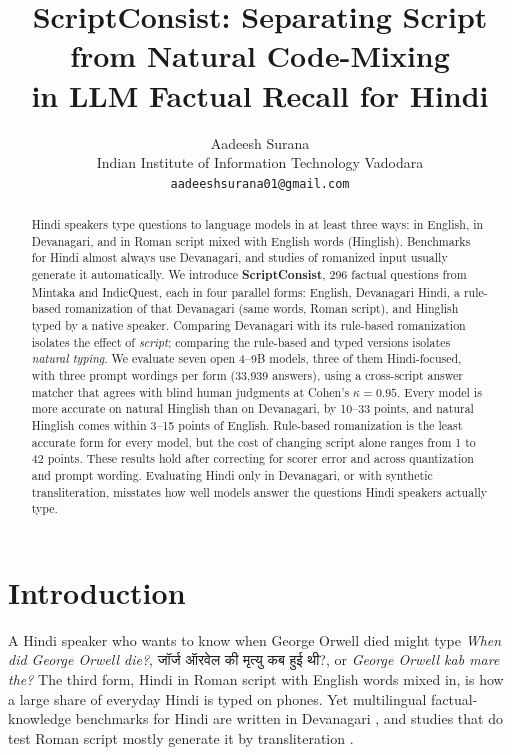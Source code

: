\documentclass[11pt]{article}
\title{ScriptConsist: Separating Script from Natural Code-Mixing\\in LLM Factual Recall for Hindi}
\author{Aadeesh Surana \\
  Indian Institute of Information Technology Vadodara \\
  \texttt{aadeeshsurana01@gmail.com}}
\newcommand{\hi}[1]{{\devfont #1}}
\newcommand{\Dev}{Devanagari}
\newcommand{\Hng}{natural Hinglish}
\begin{document}
\maketitle

\begin{abstract}
Hindi speakers type questions to language models in at least three ways: in English, in Devanagari, and in Roman script mixed with English words (Hinglish).
Benchmarks for Hindi almost always use Devanagari, and studies of romanized input usually generate it automatically.
We introduce \textbf{ScriptConsist}, 296 factual questions from Mintaka and IndicQuest, each in four parallel forms: English, \Dev{} Hindi, a rule-based romanization of that \Dev{} (same words, Roman script), and Hinglish typed by a native speaker.
Comparing \Dev{} with its rule-based romanization isolates the effect of \emph{script}; comparing the rule-based and typed versions isolates \emph{natural typing}.
We evaluate seven open 4--9B models, three of them Hindi-focused, with three prompt wordings per form (33{,}939 answers), using a cross-script answer matcher that agrees with blind human judgments at Cohen's $\kappa = 0.95$.
Every model is more accurate on \Hng{} than on \Dev{}, by 10--33 points, and \Hng{} comes within 3--15 points of English.
Rule-based romanization is the least accurate form for every model, but the cost of changing script alone ranges from 1 to 42 points.
These results hold after correcting for scorer error and across quantization and prompt wording.
Evaluating Hindi only in \Dev{}, or with synthetic transliteration, misstates how well models answer the questions Hindi speakers actually type.
\end{abstract}

\section{Introduction}

A Hindi speaker who wants to know when George Orwell died might type \emph{When did George Orwell die?}, \hi{जॉर्ज ऑरवेल की मृत्यु कब हुई थी}?, or \emph{George Orwell kab mare the?}
The third form, Hindi in Roman script with English words mixed in, is how a large share of everyday Hindi is typed on phones.
Yet multilingual factual-knowledge benchmarks for Hindi are written in Devanagari \citep{rohera2024indicquest,jain2026indicquestv2}, and studies that do test Roman script mostly generate it by transliteration \citep{das2026indiromcom}.
\end{document}
